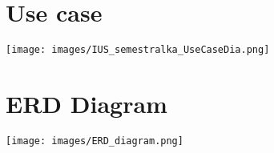 \documentclass[12pt,a4paper]{article} %
\begin{document}
    \section*{Use case} %
        \center\texttt{[image: images/IUS\_semestralka\_UseCaseDia.png]}
	\clearpage
	\section*{ERD Diagram} %
        

            \texttt{[image: images/ERD\_diagram.png]}

	\clearpage


	
\end{document}
